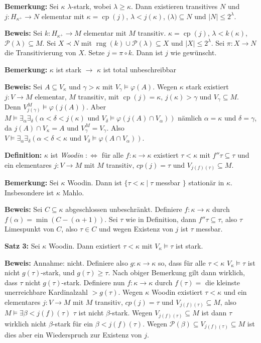 \documentclass[a4paper,fontsize=11pt]{scrartcl}
\newcommand{\rng}{\operatorname{rng}}
\newcommand{\cp}{\operatorname{cp}}
\begin{document}
{\bf Bemerkung:} Sei $\kappa$ $\lambda$-stark, wobei $\lambda\ge\kappa$.
	Dann existieren transitives $N$ und $j\colon H_{\kappa^+}\to N$ elementar mit $\kappa=\cp(j)$, $\lambda<j(\kappa)$, $\mathcal(\lambda)\subseteq N$ und $|N|\le 2^\lambda$.

	{\bf Beweis:} Sei $k \colon H_{\kappa^+}\to M$ elementar mit $M$ transitiv.
		$\kappa=\cp(j)$, $\lambda<k(\kappa)$, $\mathcal P(\lambda)\subseteq M$.
		Sei $X\prec N$ mit $\rng(k)\cup\mathcal P(\lambda)\subseteq X$ und $|X|\le 2^\lambda$.
		Sei $\pi\colon X\to N$ die Transitivierung von $X$.
		Setze $j=\pi\circ k$.
		Dann ist $j$ wie gewünscht.


{\bf Bemerkung:} $\kappa$ ist stark $\to$ $\kappa$ ist total unbeschreibbar

	{\bf Beweis:} Sei $A\subseteq V_\kappa$ und $\gamma >\kappa$ mit $V_{\gamma}\models\varphi(A)$.
		Wegen $\kappa$ stark existiert $j\colon V\to M$ elementar, $M$ transitiv, mit $\cp(j)=\kappa$, $j(\kappa)>\gamma$ und $V_\gamma\subseteq M$.
		Denn $V_{j(\gamma)}^M\models \varphi(j(A))$.
		Aber $M\models \exists_\alpha\exists_\delta\left(\alpha<\delta<j(\kappa) \mbox{ und } V_{\delta}\models \varphi(j(A)\cap V_{\alpha})\right)$
		nämlich $\alpha=\kappa$ und $\delta=\gamma$, da $j(A)\cap V_{\kappa}=A$ und $V^M_{\gamma}=V_\gamma$.
		Also $V\models\exists_\alpha\exists_\delta\left( \alpha<\delta<\kappa \mbox{ und } V_{\delta}\models\varphi(A\cap V_{\alpha})\right)$.

{\bf Definition:} $\kappa$ ist {\em Woodin} $:\iff$ für alle $f\colon\kappa\to\kappa$ existiert $\tau<\kappa$ mit $f''\tau \subseteq \tau$ und ein elementares $j\colon V\to M$ mit $M$ transitiv, $cp(j)=\tau$ und $V_{j(f)(\tau)}\subseteq M$.

{\bf Bemerkung:} Sei $\kappa$ Woodin.
	Dann ist $\{ \tau<\kappa\mid  \tau$ messbar $\}$ stationär in $\kappa$.
	Insbesondere ist $\kappa$ Mahlo.

	{\bf Beweis:} Sei $C\subseteq\kappa$ abgeschlossen unbeschränkt. 
		Definiere $f\colon \kappa\to\kappa$ durch $f(\alpha) = \min (C-(\alpha+1))$.
		Sei $\tau$ wie in Definition, dann $f''\tau\subseteq\tau$, also $\tau$ Limespunkt von $C$, also $\tau\in C$ und wegen Existenz von $j$ ist $\tau$ messbar.

{\bf Satz 3:} Sei $\kappa$ Woodin.
	Dann existiert $\tau<\kappa$ mit $V_\kappa\models\tau$ ist stark.

	{\bf Beweis:} Annahme: nicht.
		Definiere also $g\colon\kappa\to\kappa$ so, dass für alle $\tau<\kappa$ $V_{\kappa}\models\tau$ ist nicht $g(\tau)$-stark, und $g(\tau)\ge\tau$.
		Nach obiger Bemerkung gilt dann wirklich, dass $\tau$ nicht $g(\tau)$-stark.
		Definiere nun $f\colon\kappa\to\kappa$ durch $f(\tau)=$ die kleinste unerreichbare Kardinalzahl $>g(\tau)$.
		Wegen $\kappa$ Woodin existiert $\tau<\kappa$ und ein elementares $j\colon V\to M$ mit $M$ transitiv, $cp(j)=\tau$ und $V_{j(f)(\tau)}\subseteq M$, also 
		$M\models \exists \beta<j(f)(\tau)$ $\tau$ ist nicht $\beta$-stark.
		Wegen $V_{j(f)(\tau)}\subseteq M$ ist dann $\tau$ wirklich nicht $\beta$-stark für ein $\beta< j(f)(\tau)$.
		Wegen $\mathcal P(\beta)\subseteq V_{j(f)(\tau)}\subseteq M$ ist dies aber ein Wiederspruch zur Existenz von $j$.
\end{document}
